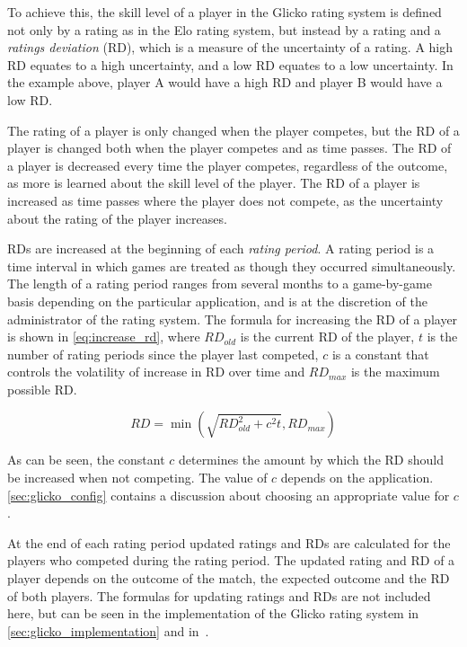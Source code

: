 To achieve this, the skill level of a player in the Glicko rating system is defined not only by a rating as in the Elo rating system, but instead by a rating and a \emph{ratings deviation} (RD), which is a measure of the uncertainty of a rating.
A high RD equates to a high uncertainty, and a low RD equates to a low uncertainty.
In the example above, player A would have a high RD and player B would have a low RD.

The rating of a player is only changed when the player competes, but the RD of a player is changed both when the player competes and as time passes.
The RD of a player is decreased every time the player competes, regardless of the outcome, as more is learned about the skill level of the player.
The RD of a player is increased as time passes where the player does not compete, as the uncertainty about the rating of the player increases.

RDs are increased at the beginning of each \emph{rating period}.
A rating period is a time interval in which games are treated as though they occurred simultaneously.
The length of a rating period ranges from several months to a game-by-game basis depending on the particular application, and is at the discretion of the administrator of the rating system.
The formula for increasing the RD of a player is shown in \autoref{eq:increase_rd}, where $RD_{old}$ is the current RD of the player, $t$ is the number of rating periods since the player last competed, $c$ is a constant that controls the volatility of increase in RD over time and $RD_{max}$ is the maximum possible RD.

\begin{equation} \label{eq:increase_rd}
RD = \min \left( \sqrt{RD_{old}^2 + c^2t}, RD_{max} \right)
\end{equation}

As can be seen, the constant $c$ determines the amount by which the RD should be increased when not competing.
The value of $c$ depends on the application.
\autoref{sec:glicko_config} contains a discussion about choosing an appropriate value for $c$.

At the end of each rating period updated ratings and RDs are calculated for the players who competed during the rating period.
The updated rating and RD of a player depends on the outcome of the match, the expected outcome and the RD of both players.
The formulas for updating ratings and RDs are not included here, but can be seen in the implementation of the Glicko rating system in \autoref{sec:glicko_implementation} and in~\citep{glicko}.


